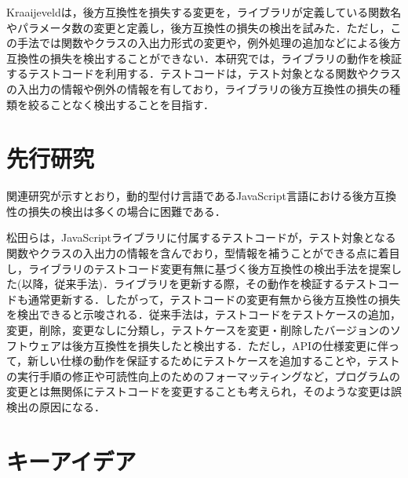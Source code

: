 \documentclass[11pt,dvipdfmx]{jreport}
\begin{document}
Kraaijeveldは，後方互換性を損失する変更を，ライブラリが定義している関数名やパラメータ数の変更と定義し，後方互換性の損失の検出を試みた\cite{detecting-breaking-changes-in-js-apis}．ただし，この手法では関数やクラスの入出力形式の変更や，例外処理の追加などによる後方互換性の損失を検出することができない．本研究では，ライブラリの動作を検証するテストコードを利用する．テストコードは，テスト対象となる関数やクラスの入出力の情報や例外の情報を有しており，ライブラリの後方互換性の損失の種類を絞ることなく検出することを目指す．



\section{先行研究}
関連研究が示すとおり，動的型付け言語であるJavaScript言語における後方互換性の損失の検出は多くの場合に困難である．

松田らは，JavaScriptライブラリに付属するテストコードが，テスト対象となる関数やクラスの入出力の情報を含んでおり，型情報を補うことができる点に着目し，ライブラリのテストコード変更有無に基づく後方互換性の検出手法を提案した\cite{matsuda}(以降，従来手法)．ライブラリを更新する際，その動作を検証するテストコードも通常更新する．したがって，テストコードの変更有無から後方互換性の損失を検出できると示唆される．従来手法は，テストコードをテストケースの追加，変更，削除，変更なしに分類し，テストケースを変更・削除したバージョンのソフトウェアは後方互換性を損失したと検出する．ただし，APIの仕様変更に伴って，新しい仕様の動作を保証するためにテストケースを追加することや，テストの実行手順の修正や可読性向上のためのフォーマッティングなど，プログラムの変更とは無関係にテストコードを変更することも考えられ，そのような変更は誤検出の原因になる．

\section{キーアイデア}\label{sec:key-idea}
\end{document}
